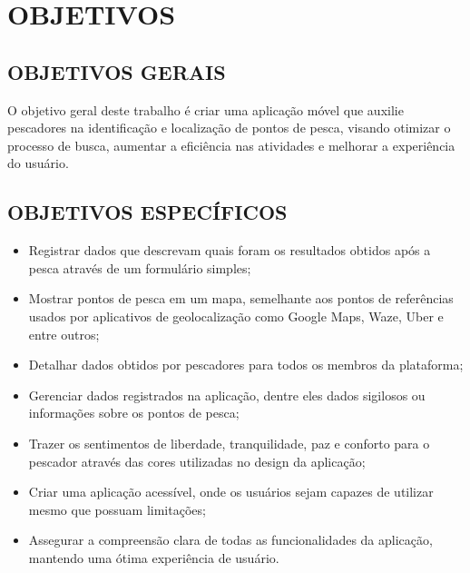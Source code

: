 
\chapter{OBJETIVOS}
\label{chap:objetivos}

\section{OBJETIVOS GERAIS}
\label{sec:objetivosGerais}

O objetivo geral deste trabalho é criar uma aplicação móvel que auxilie pescadores na identificação e localização de pontos de pesca, visando otimizar o processo de busca, aumentar a eficiência nas atividades e melhorar a experiência do usuário.

\section{OBJETIVOS ESPECÍFICOS}
\label{sec:objetivosEspecificos}

\begin{itemize}
  \item Registrar dados que descrevam quais foram os resultados obtidos após a pesca através de um formulário simples;
  \item Mostrar pontos de pesca em um mapa, semelhante aos pontos de referências usados por aplicativos de geolocalização como Google Maps, Waze, Uber e entre outros;
  \item Detalhar dados obtidos por pescadores para todos os membros da plataforma;
  \item Gerenciar dados registrados na aplicação, dentre eles dados sigilosos ou informações sobre os pontos de pesca;
  \item Trazer os sentimentos de liberdade, tranquilidade, paz e conforto para o pescador através das cores utilizadas no design da aplicação;
  \item Criar uma aplicação acessível, onde os usuários sejam capazes de utilizar mesmo que possuam limitações;
  \item Assegurar a compreensão clara de todas as funcionalidades da aplicação, mantendo uma ótima experiência de usuário. 
\end{itemize}